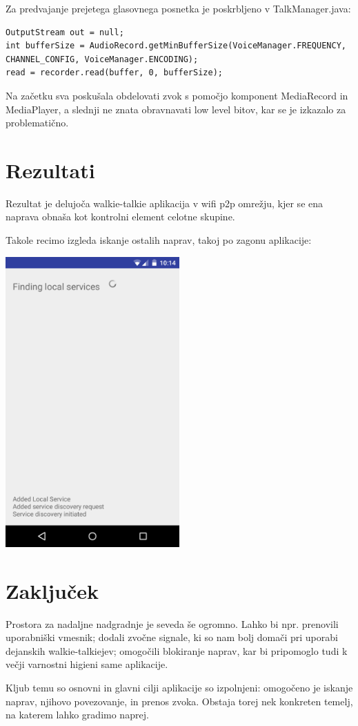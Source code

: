 \documentclass[11pt,a4paper,slovene]{article}
\begin{document}
Za predvajanje prejetega glasovnega posnetka je poskrbljeno v TalkManager.java:
\begin{verbatim}
OutputStream out = null;
int bufferSize = AudioRecord.getMinBufferSize(VoiceManager.FREQUENCY, 
CHANNEL_CONFIG, VoiceManager.ENCODING);
read = recorder.read(buffer, 0, bufferSize);
\end{verbatim}

Na začetku sva poskušala obdelovati zvok s pomočjo komponent MediaRecord in MediaPlayer, a slednji ne znata obravnavati low level bitov, kar se je izkazalo za problematično.

\pagebreak
\section{Rezultati}
Rezultat je delujoča walkie-talkie aplikacija v wifi p2p omrežju, kjer se ena naprava obnaša kot kontrolni element celotne skupine.

Takole recimo izgleda iskanje ostalih naprav, takoj po zagonu aplikacije:

\begin{minipage}{\linewidth}
	\centering
	\includegraphics[width=0.5\textwidth]{img}
	\label{fig:iskanje_naprav}
\end{minipage}

\section{Zaključek}
Prostora za nadaljne nadgradnje je seveda še ogromno. Lahko bi npr. prenovili uporabniški vmesnik; dodali zvočne signale, ki so nam bolj domači pri uporabi dejanskih walkie-talkiejev; omogočili blokiranje naprav, kar bi pripomoglo tudi k večji varnostni higieni same aplikacije.

Kljub temu so osnovni in glavni cilji aplikacije so izpolnjeni: omogočeno je iskanje naprav, njihovo povezovanje, in prenos zvoka. Obstaja torej nek konkreten temelj, na katerem lahko gradimo naprej.
\pagebreak
\end{document}
